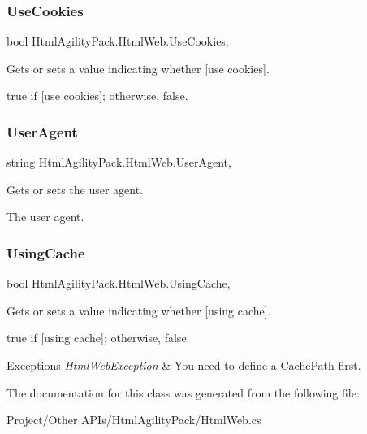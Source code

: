 \subsubsection{\texorpdfstring{Use\+Cookies}{UseCookies}}
{\footnotesize\ttfamily bool Html\+Agility\+Pack.\+Html\+Web.\+Use\+Cookies\hspace{0.3cm}{\ttfamily [get]}, {\ttfamily [set]}}



Gets or sets a value indicating whether \mbox{[}use cookies\mbox{]}. 

{\ttfamily true} if \mbox{[}use cookies\mbox{]}; otherwise, {\ttfamily false}.\mbox{\label{class_html_agility_pack_1_1_html_web_a492089f2da916c27e99fb6bb732938df}} 
\subsubsection{\texorpdfstring{User\+Agent}{UserAgent}}
{\footnotesize\ttfamily string Html\+Agility\+Pack.\+Html\+Web.\+User\+Agent\hspace{0.3cm}{\ttfamily [get]}, {\ttfamily [set]}}



Gets or sets the user agent. 

The user agent.\mbox{\label{class_html_agility_pack_1_1_html_web_a4937827277fc08dacaef28144d2e48b5}} 
\subsubsection{\texorpdfstring{Using\+Cache}{UsingCache}}
{\footnotesize\ttfamily bool Html\+Agility\+Pack.\+Html\+Web.\+Using\+Cache\hspace{0.3cm}{\ttfamily [get]}, {\ttfamily [set]}}



Gets or sets a value indicating whether \mbox{[}using cache\mbox{]}. 

{\ttfamily true} if \mbox{[}using cache\mbox{]}; otherwise, {\ttfamily false}.


\begin{DoxyExceptions}{Exceptions}
{\em \hyperlink{class_html_agility_pack_1_1_html_web_exception}{Html\+Web\+Exception}} & You need to define a Cache\+Path first.\\
\hline
\end{DoxyExceptions}


The documentation for this class was generated from the following file\+:\begin{DoxyCompactItemize}
\item 
Project/\+Other A\+P\+Is/\+Html\+Agility\+Pack/Html\+Web.\+cs\end{DoxyCompactItemize}
